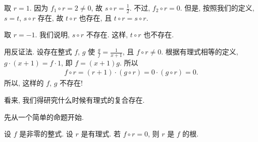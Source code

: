 \begin{example}
    取 $r = 1$. 因为 $f_1 \circ r = 2 \neq 0$, 故 $s \circ r = \frac{1}{2}$. 不过, $f_2 \circ r = 0$. 但是, 按照我们的定义, $s = t$, $s \circ r$ 存在, 故 $t \circ r$ 也存在, 且 $t \circ r = s \circ r$.
\end{example}

\begin{example}
    取 $r = -1$. 我们说明, $s \circ r$ 不存在. 这样, $t \circ r$ 也不存在.

    用反证法. 设存在整式 $f$, $g$ 使 $\frac{g}{f} = \frac{1}{x+1}$, 且 $f \circ r \neq 0$. 根据有理式相等的定义, $g \cdot (x+1) = f \cdot 1$, 即 $f = (x+1) g$. 所以
    \begin{align*}
        f \circ r = (r+1) \cdot (g \circ r) = 0 \cdot (g \circ r) = 0.
    \end{align*}
    所以, 这样的 $f$, $g$ 不存在!
\end{example}

看来, 我们得研究什么时候有理式的复合存在.

先从一个简单的命题开始.

\begin{proposition}
    设 $f$ 是非零的整式. 设 $r$ 是有理式. 若 $f \circ r = 0$, 则 $r$ 是 $f$ 的根.
\end{proposition}

